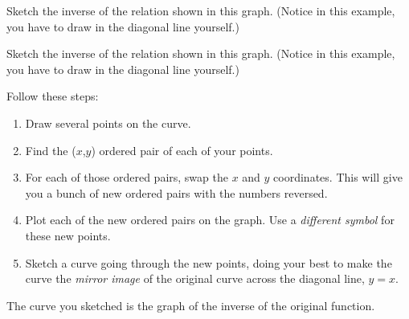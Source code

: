 \documentclass[fleqn,letterpaper,12pt,printwatermark=false]{memoir}
\begin{document}
\begin{myExampleForTikzGraphs}[1]{
    Sketch the inverse of the relation shown in this graph.
    (Notice in this example, you have to draw in the diagonal line yourself.)
}
\end{myExampleForTikzGraphs}

\begin{myExampleForTikzGraphs}[2]{
    Sketch the inverse of the relation shown in this graph.
    (Notice in this example, you have to draw in the diagonal line yourself.)
}
\end{myExampleForTikzGraphs}

\begin{myKeyConcepts}
    Follow these steps:
    \begin{enumerate}
        \item Draw several points on the curve.
        \item Find the ($x$,$y$) ordered pair of each of your points.
        \item For each of those ordered pairs, 
        swap the $x$ and $y$ coordinates.
        This will give you a bunch of new ordered pairs with the numbers reversed.
        \item Plot each of the new ordered pairs on the graph.
        Use a \emph{different symbol} for these new points.
        \item Sketch a curve going through the new points, 
        doing your best to make the curve the \emph{mirror image} 
        of the original curve across the diagonal line, $y=x$.
    \end{enumerate}
    The curve you sketched is the graph of the inverse of the original function.
\end{myKeyConcepts}
\end{document}
